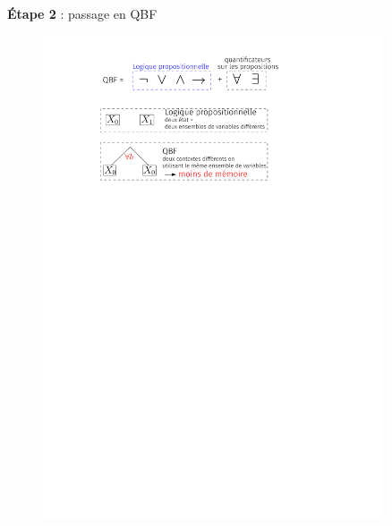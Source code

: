 \documentclass[english,french,usenames,dvipsnames]{beamer}
\begin{document}
\begin{frame}{\subsecname}
\textbf{Étape 2} : passage en QBF
\begin{figure}
\includegraphics[width=0.9\textwidth]{figures/coplas2018/sat-vs-qbf.pdf}
\end{figure}
\end{frame}
\end{document}
